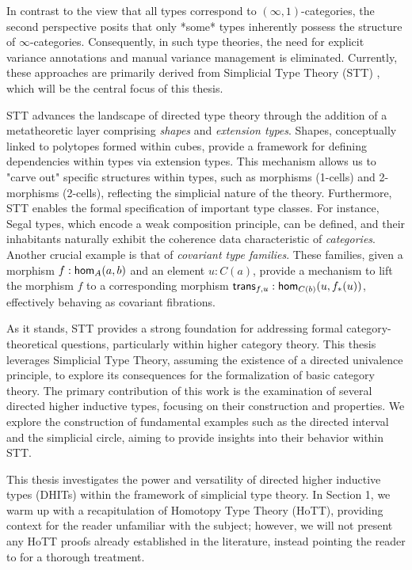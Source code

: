 \documentclass[main.tex]{subfiles}
\begin{document}
In contrast to the view that all types correspond to $(\infty,1)$-categories, the second perspective posits that only *some* types inherently possess the structure of $\infty$-categories. Consequently, in such type theories, the need for explicit variance annotations and manual variance management is eliminated. Currently, these approaches are primarily derived from Simplicial Type Theory (STT) \cite{riehl_type_2017}, which will be the central focus of this thesis.

STT advances the landscape of directed type theory through the addition of a metatheoretic layer comprising \textit{shapes} and \textit{extension types}. Shapes, conceptually linked to polytopes formed within cubes, provide a framework for defining dependencies within types via extension types. This mechanism allows us to "carve out" specific structures within types, such as morphisms (1-cells) and 2-morphisms (2-cells), reflecting the simplicial nature of the theory. Furthermore, STT enables the formal specification of important type classes. For instance, Segal types, which encode a weak composition principle, can be defined, and their inhabitants naturally exhibit the coherence data characteristic of \textit{categories}. Another crucial example is that of \textit{covariant type families}. These families, given a morphism $f : \ho[A]{a}{b}$ and an element $u : C(a)$, provide a mechanism to lift the morphism $f$ to a corresponding morphism $\trans{f}{u}:\ho[C(b)]{u}{f_*(u)}$, effectively behaving as covariant fibrations.

As it stands, STT provides a strong foundation for addressing formal category-theoretical questions, particularly within higher category theory. This thesis leverages Simplicial Type Theory, assuming the existence of a directed univalence principle, to explore its consequences for the formalization of basic category theory. The primary contribution of this work is the examination of several directed higher inductive types, focusing on their construction and properties. We explore the construction of fundamental examples such as the directed interval and the simplicial circle, aiming to provide insights into their behavior within STT.

This thesis investigates the power and versatility of directed higher inductive types (DHITs) within the framework of simplicial type theory. In Section 1, we warm up with a recapitulation of Homotopy Type Theory (HoTT), providing context for the reader unfamiliar with the subject; however, we will not present any HoTT proofs already established in the literature, instead pointing the reader to \cite{program_homotopy_2013} for a thorough treatment. 
\end{document}
